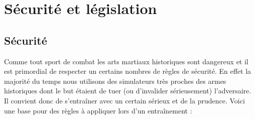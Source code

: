 \chapter{Sécurité et législation}
\label{app:sécurité}


\section{Sécurité}


Comme tout sport de combat les arts martiaux historiques sont dangereux et il est primordial de respecter un certains nombres de règles de sécurité.
En effet la majorité du temps nous utilisons des simulateurs très proches des armes historiques dont le but étaient de tuer (ou d'invalider sérieusement) l'adversaire.
Il convient donc de s'entraîner avec un certain sérieux et de la prudence.
Voici une base pour des règles à appliquer lors d'un entraînement :
